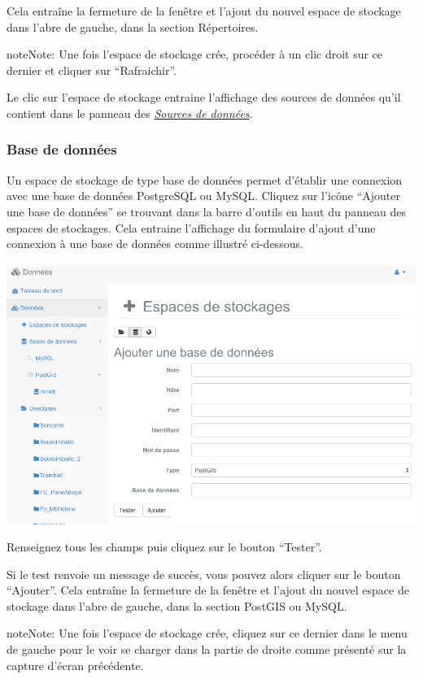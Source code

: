 \documentclass[letterpaper,10pt,french]{sphinxmanual}
\begin{document}
Cela entraîne la fermeture de la fenêtre et l'ajout du nouvel espace de stockage dans l'abre de gauche, dans la section Répertoires.

\begin{notice}{note}{Note:}
Une fois l'espace de stockage crée, procéder à un clic droit sur ce dernier et cliquer sur ``Rafraichir''.
\end{notice}

Le clic sur l'espace de stockage entraine l'affichage des sources de données qu'il contient dans le panneau des {\hyperref[data/datasources::doc]{\emph{\emph{Sources de données}}}}.


\subsubsection{Base de données}
\label{data/datastores:base-de-donnees}
Un espace de stockage de type base de données permet d'établir une
connexion avec une base de données PostgreSQL ou MySQL. Cliquez sur
l'icône ``Ajouter une base de données'' se trouvant dans la barre
d'outils en haut du panneau des espaces de stockages. Cela entraine
l'affichage du formulaire d'ajout d'une connexion à une base de données
comme illustré ci-dessous.

\includegraphics[width=1.000\linewidth]{add-database-window.png}

Renseignez tous les champs puis cliquez sur le bouton ``Tester''.

Si le test renvoie un message de succès, vous pouvez alors cliquer sur le bouton ``Ajouter''. Cela entraîne la fermeture de la fenêtre et l'ajout du nouvel espace de stockage dans l'abre de gauche, dans la section PostGIS ou MySQL.

\begin{notice}{note}{Note:}
Une fois l'espace de stockage crée, cliquez sur ce dernier dans le
menu de gauche pour le voir se charger dans la partie de droite
comme présenté sur la capture d'écran précédente.
\end{notice}
\end{document}

